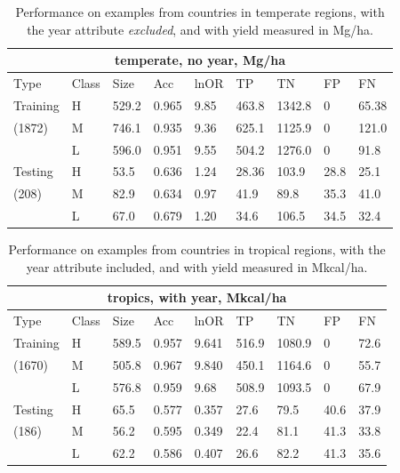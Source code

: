 \documentclass[12pt]{article}
\begin{document}
\begin{table}[h!]
\centering
\begin{tabular}{lllllllll}
\toprule
\multicolumn{9}{c}{\textbf{temperate, no year, Mg/ha}} \\
\midrule
Type & Class & Size & Acc & lnOR & TP & TN & FP & FN \\
\midrule
Training & H & 529.2 & 0.965 & 9.85 & 463.8 & 1342.8 & 0 & 65.38  \\
(1872) & M & 746.1 & 0.935 & 9.36 & 625.1 & 1125.9 & 0 & 121.0  \\
& L & 596.0 & 0.951 & 9.55 & 504.2 & 1276.0 & 0 & 91.8  \\
Testing & H & 53.5 & 0.636 & 1.24 & 28.36 & 103.9 & 28.8 & 25.1  \\
(208) & M & 82.9 & 0.634 & 0.97 & 41.9 & 89.8 & 35.3 & 41.0  \\
& L & 67.0 & 0.679 & 1.20 & 34.6 & 106.5 & 34.5 & 32.4  \\
\bottomrule
\end{tabular}
\caption{Performance on examples from countries in temperate regions, with the year attribute \emph{excluded}, and with yield measured in Mg/ha.}
\label{t.ny.temp_results}
\end{table}

\begin{table}[h!]
\centering
\begin{tabular}{lllllllll}
\toprule
\multicolumn{9}{c}{\textbf{tropics, with year, Mkcal/ha}} \\
\midrule
Type & Class & Size & Acc & lnOR & TP & TN & FP & FN \\
\midrule
Training & H & 589.5 & 0.957 & 9.641 & 516.9 & 1080.9 & 0 & 72.6  \\
(1670) & M & 505.8 & 0.967 & 9.840 & 450.1 & 1164.6 & 0 & 55.7  \\
& L & 576.8 & 0.959 & 9.68 & 508.9 & 1093.5 & 0 & 67.9  \\
Testing & H & 65.5 & 0.577 & 0.357 & 27.6 & 79.5 & 40.6 & 37.9  \\
(186) & M & 56.2 & 0.595 & 0.349 & 22.4 & 81.1 & 41.3 & 33.8  \\
& L & 62.2 & 0.586 & 0.407 & 26.6 & 82.2 & 41.3 & 35.6  \\
\bottomrule
\end{tabular}
\caption{Performance on examples from countries in tropical regions, with the year attribute included, and with yield measured in Mkcal/ha.}
\label{k.wy.trop_results}
\end{table}
\end{document}
